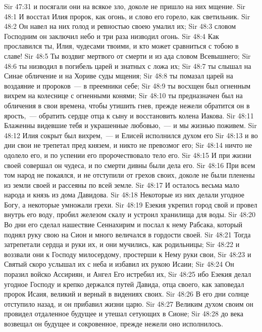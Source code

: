 \vs Sir 47:31 и посягали они на всякое зло, доколе не пришло на них мщение.
\vs Sir 48:1 И восстал Илия пророк, как огонь, и слово его горело, как светильник.
\vs Sir 48:2 Он навел на них голод и ревностью своею умалил  их;
\vs Sir 48:3 словом Господним он заключил небо и три раза низводил огонь.
\vs Sir 48:4 Как прославился ты, Илия, чудесами твоими, и кто может сравниться с тобою в славе!
\vs Sir 48:5 Ты воздвиг мертвого от смерти и из ада словом Всевышнего;
\vs Sir 48:6 ты низводил в погибель царей и знатных с ложа их;
\vs Sir 48:7 ты слышал на Синае обличение  и на Хориве суды мщения;
\vs Sir 48:8 ты помазал царей на воздаяние и пророков~--- в преемники себе;
\vs Sir 48:9 ты восхщен был огненным вихрем на колеснице с огненными конями;
\vs Sir 48:10 ты предназначен был на обличения в свои времена, чтобы утишить гнев, прежде нежели обратится он в ярость,~--- обратить сердце отца к сыну и восстановить колена Иакова.
\vs Sir 48:11 Блаженны видевшие тебя и украшенные любовью,~--- и мы жизнью поживем.
\vs Sir 48:12 Илия сокрыт был вихрем,~--- и Елисей исполнился духом его
\vs Sir 48:13 и во дни свои не трепетал пред князем, и никто не превозмог его;
\vs Sir 48:14 ничто не одолело его, и по успении его пророчествовало тело его.
\vs Sir 48:15 И при жизни своей совершал он чудеса, и по смерти дивны были дела его.
\rsbpar\vs Sir 48:16 При всем том народ не покаялся, и не отступили от грехов своих, доколе не были пленены из земли своей и рассеяны по всей земле.
\vs Sir 48:17 И осталось весьма мало народа и князь из дома Давидова.
\vs Sir 48:18 Некоторые из них делали угодное Богу, а некоторые умножали грехи.
\vs Sir 48:19 Езекия укрепил город свой и провел внутрь его воду, пробил железом скалу и устроил хранилища для воды.
\vs Sir 48:20 Во дни его сделал нашествие Сеннахирим и послал к нему Рабсака, который поднял руку свою на Сион и много величался в гордости своей.
\vs Sir 48:21 Тогда затрепетали сердца и руки их, и они мучились, как родильницы;
\vs Sir 48:22 и воззвали они к Господу милосердому, простерши к Нему руки свои,
\vs Sir 48:23 и Святый скоро услышал их с неба и избавил их рукою Исаии;
\vs Sir 48:24 Он поразил войско Ассириян, и Ангел Его истребил их,
\vs Sir 48:25 ибо Езекия делал угодное Господу и крепко держался путей Давида, отца своего, как заповедал пророк Исаия, великий и верный в видениях своих.
\vs Sir 48:26 В его дни солнце отступило назад, и он прибавил жизни царю.
\vs Sir 48:27 Великим духом своим он провидел отдаленное будущее и утешал сетующих в Сионе;
\vs Sir 48:28 до века возвещал он будущее и сокровенное, прежде нежели оно исполнилось.
